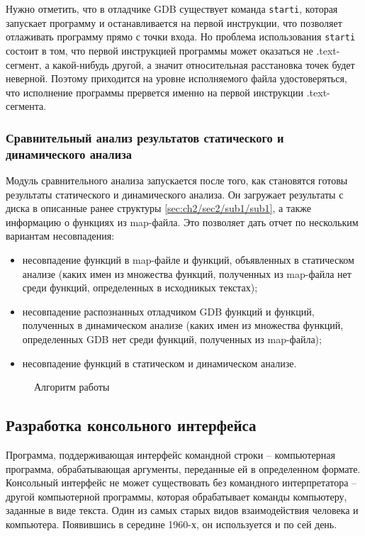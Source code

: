 Нужно отметить, что в отладчике GDB существует команда \texttt{starti}, которая запускает программу и 
останавливается на первой инструкции, что позволяет отлаживать программу прямо с точки входа.
Но проблема использования \texttt{starti} состоит в том, что первой инструкцией программы может оказаться
не .text-сегмент, а какой-нибудь другой, а значит относительная расстановка точек будет неверной.
Поэтому приходится на уровне исполняемого файла удостоверяться, что исполнение программы прервется
именно на первой инструкции .text-сегмента.

\subsubsection{Сравнительный анализ результатов статического и динамического анализа}\label{sec:ch2/sec2/sub3/sub3}
Модуль сравнительного анализа запускается после того, как становятся готовы результаты статического и
динамического анализа.
Он загружает результаты с диска в описанные ранее структуры \autoref{sec:ch2/sec2/sub1/sub1}, а также
информацию о функциях из map-файла.
Это позволяет дать отчет по нескольким вариантам несовпадения:
\begin{itemize}
    \item несовпадение функций в map-файле и функций, объявленных в статическом анализе
        (каких имен из множества функций, полученных из map-файла нет среди функций, определенных в исходникых текстах);
    \item несовпадение распознанных отладчиком GDB функций и функций, полученных в динамическом анализе
        (каких имен из множества функций, определенных GDB нет среди функций, полученных из map-файла);
    \item несовпадение функций в статическом и динамическом анализе.
\end{itemize}

\begin{figure}[!htbp]
    \centerfloat{
        
    }
    \caption{Алгоритм работы {\ProgModule}\label{fig:algorithm}}
\end{figure}

\subsection{Разработка консольного интерфейса {\ProgModule}}\label{sec:ch2/sec2/sub4}
Программа, поддерживающая интерфейс командной строки --
компьютерная программа, обрабатывающая аргументы, переданные ей в определенном формате. 
Консольный интерфейс не может существовать без командного интерпретатора -- другой компьютерной программы, которая
обрабатывает команды компьютеру, заданные в виде текста.
Один из самых старых видов взаимодействия человека и компьютера.
Появившись в середине 1960-х, он используется и по сей день.


